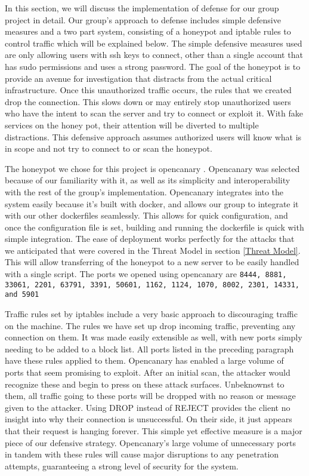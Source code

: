 In this section, we will discuss the implementation of defense for our group project in detail. Our group's approach to defense includes simple defensive measures and a two part system, consisting of a honeypot and iptable rules to control traffic which will be explained below. The simple defensive measures used are only allowing users with ssh keys to connect, other than a single account that has sudo permissions and uses a strong password. The goal of the honeypot is to provide an avenue for investigation that distracts from the actual critical infrastructure. Once this unauthorized traffic occurs, the rules that we created drop the connection. This slows down or may entirely stop unauthorized users who have the intent to scan the server and try to connect or exploit it. With fake services on the honey pot, their attention will be diverted to multiple distractions. This defensive approach assumes authorized users will know what is in scope and not try to connect to or scan the honeypot.

The honeypot we chose for this project is opencanary \cite{opencanary}. Opencanary was selected because of our familiarity with it, as well as its simplicity and interoperability with the rest of the group's implementation. Opencanary integrates into the system easily because it’s built with docker, and allows our group to integrate it with our other dockerfiles seamlessly. This allows for quick configuration, and once the configuration file is set, building and running the dockerfile is quick with simple integration. The ease of deployment works perfectly for the attacks that we anticipated that were covered in the Threat Model in section \ref{Threat Model}. This will allow transferring of the honeypot to a new server to be easily handled with a single script. The ports we opened using opencanary are \texttt{8444, 8881, 33061, 2201, 63791, 3391, 50601, 1162, 1124, 1070, 8002, 2301, 14331, and 5901}

Traffic rules set by iptables include a very basic approach to discouraging traffic on the machine. The rules we have set up drop incoming traffic, preventing any connection on them. It was made easily extensible as well, with new ports simply needing to be added to a block list. All ports listed in the preceding paragraph have these rules applied to them. Opencanary has enabled a large volume of ports that seem promising to exploit. After an initial scan, the attacker would recognize these and begin to press on these attack surfaces. Unbeknownst to them, all traffic going to these ports will be dropped with no reason or message given to the attacker. Using DROP instead of REJECT provides the client no insight into why their connection is unsuccessful. On their side, it just appears that their request is hanging forever. This simple yet effective measure is a major piece of our defensive strategy. Opencanary’s large volume of unnecessary ports in tandem with these rules will cause major disruptions to any penetration attempts, guaranteeing a strong level of security for the system.


